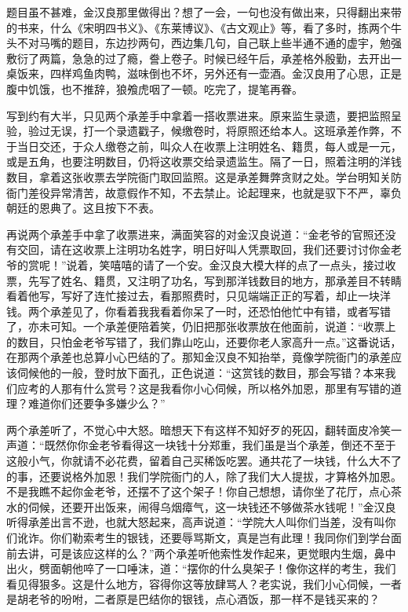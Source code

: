\documentclass[12pt,UTF8]{ctexbook}
\begin{document}
{{{题目虽不甚难，金汉良那里做得出？想了一会，一句也没有做出来，只得翻出来带的书来，什么《宋明四书义》、《东莱博议》、《古文观止》等，看了多时，拣两个牛头不对马嘴的题目，东边抄两句，西边集几句，自己联上些半通不通的虚宇，勉强敷衍了两篇，急急的过了瘾，誊上卷子。时候已经午后，承差格外殷勤，去开出一桌饭来，四样鸡鱼肉鸭，滋味倒也不坏，另外还有一壶酒。金汉良用了心思，正是腹中饥饿，也不推辞，狼飧虎咽了一顿。吃完了，提笔再眷。

写到约有大半，只见两个承差手中拿着一搭收票进来。原来监生录遗，要把监照呈验，验过无误，打一个录遗戳子，候缴卷时，将原照还给本人。这班承差作弊，不于当日交还，于众人缴卷之前，叫众人在收票上注明姓名、籍贯，每人或是一元，或是五角，也要注明数目，仍将这收票交给录遗监生。隔了一日，照着注明的洋钱数目，拿着这张收票去学院衙门取回监照。这是承差舞弊贪财之处。学台明知关防衙门差役异常清苦，故意假作不知，不去禁止。论起理来，也就是驭下不严，辜负朝廷的恩典了。这且按下不表。

再说两个承差手中拿了收票进来，满面笑容的对金汉良说道：“金老爷的官照还没有交回，请在这收票上注明功名姓字，明日好叫人凭票取回，我们还要讨讨你金老爷的赏呢！”说着，笑嘻嘻的请了一个安。金汉良大模大样的点了一点头，接过收票，先写了姓名、籍贯，又注明了功名，写到那洋钱数目的地方，那承差目不转睛看着他写，写好了连忙接过去，看那照费时，只见端端正正的写着，却止一块洋钱。两个承差见了，你看着我我看着你呆了一时，还恐怕他忙中有错，或者写错了，亦未可知。一个承差便陪着笑，仍旧把那张收票放在他面前，说道：“收票上的数目，只怕金老爷写错了，我们靠山吃山，还要你老人家高升一点。”这番说话，在那两个承差也总算小心巴结的了。那知金汉良不知抬举，竟像学院衙门的承差应该伺候他的一般，登时放下面孔，正色说道：“这赏钱的数目，那会写错？本来我们应考的人那有什么赏号？这是我看你小心伺候，所以格外加恩，那里有写错的道理？难道你们还要争多嫌少么？”

两个承差听了，不觉心中大怒。暗想天下有这样不知好歹的死囚，翻转面皮冷笑一声道：“既然你你金老爷看得这一块钱十分郑重，我们虽是当个承差，倒还不至于这般小气，你就请不必花费，留着自己买稀饭吃罢。通共花了一块钱，什么大不了的事，还要说格外加恩！我们学院衙门的人，除了我们大人提拔，才算格外加恩。不是我瞧不起你金老爷，还摆不了这个架子！你自己想想，请你坐了花厅，点心茶水的伺候，还要开出饭来，闹得乌烟瘴气，这一块钱还不够做茶水钱呢！”金汉良听得承差出言不逊，也就大怒起来，高声说道：“学院大人叫你们当差，没有叫你们讹诈。你们勒索考生的银钱，还要辱骂斯文，真是岂有此理！我同你们到学台面前去讲，可是该应这样的么？”两个承差听他索性发作起来，更觉眼内生烟，鼻中出火，劈面朝他啐了一口唾沫，道：“摆你的什么臭架子！像你这样的考生，我们看见得狠多。这是什么地方，容得你这等放肆骂人？老实说，我们小心伺候，一者是胡老爷的吩咐，二者原是巴结你的银钱，点心酒饭，那一样不是钱买来的？

}}}
\end{document}
